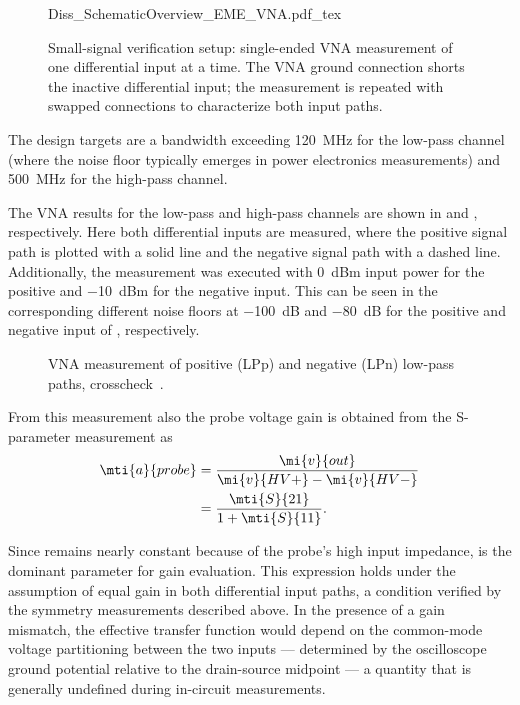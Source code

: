 \begin{figure}[ht]
	\centering
	{Diss_SchematicOverview_EME_VNA.pdf_tex}
	\caption{Small-signal verification setup: single-ended VNA measurement of one differential input at a time. The VNA ground connection shorts the inactive differential input; the measurement is repeated with swapped connections to characterize both input paths.}\label{fig:EME_VNA_SchematicOverview}
\end{figure}

The design targets are a bandwidth exceeding \SI{120}{MHz} for the low-pass channel (where the noise floor typically emerges in power electronics measurements) and \SI{500}{MHz} for the high-pass channel.

The VNA results for the low-pass and high-pass channels are shown in  and , respectively.
Here both differential inputs are measured, where the positive signal path is plotted with a solid line and the negative signal path with a dashed line.
Additionally, the measurement was executed with \SI{0}{dBm} input power for the positive and \SI{-10}{dBm} for the negative input.
This can be seen in the corresponding different noise floors at \SI{-100}{dB} and \SI{-80}{dB} for the positive and negative input of , respectively.

\begin{figure}[ht]
	\centering
	
	\caption{VNA measurement of positive (LPp) and negative (LPn) low-pass paths, crosscheck~.}\label{fig:VNA_LP}
\end{figure}

From this measurement also the probe voltage gain  is obtained from the S-parameter measurement as
\begin{align}
	\mti{a}{probe} 	&= \frac{\mi{v}{out}}{\mi{v}{HV+}-\mi{v}{HV-}} \\
					&= \frac{\mti{S}{21}}{1 + \mti{S}{11}}.
\label{eq:TF_probe}
\end{align}

Since  remains nearly constant because of the probe's high input impedance,  is the dominant parameter for gain evaluation.
This expression holds under the assumption of equal gain in both differential input paths, a condition verified by the symmetry measurements described above.
In the presence of a gain mismatch, the effective transfer function would depend on the common-mode voltage partitioning between the two inputs — determined by the oscilloscope ground potential relative to the drain-source midpoint — a quantity that is generally undefined during in-circuit measurements.

